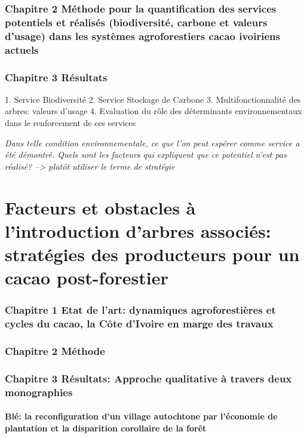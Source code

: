 \documentclass[a4paper,notitlepage]{article}
\begin{document}
\section{Chapitre 2 Méthode pour la quantification des services potentiels et réalisés (biodiversité, carbone et valeurs d'usage) dans les systèmes agroforestiers cacao ivoiriens actuels}

\section{Chapitre 3 Résultats}

1. Service Biodiversité
2. Service Stockage de Carbone
3. Multifonctionnalité des arbres: valeurs d'usage
4. Evaluation du rôle des déterminants environnementaux dans le renforcement de ces services

\textit{Dans telle condition environnementale, ce que l'on peut espérer comme service a été démontré. Quels sont les facteurs qui expliquent que ce potentiel n'est pas réalisé? --> plutôt utiliser le terme de stratégie}

\part{Facteurs et obstacles à l'introduction d'arbres associés: stratégies des producteurs pour un cacao post-forestier}
\vspace{1cm}
\section{Chapitre 1 Etat de l'art: dynamiques agroforestières et cycles du cacao, la Côte d'Ivoire en marge des travaux}

\section{Chapitre 2 Méthode}

\section{Chapitre 3 Résultats: Approche qualitative à travers deux monographies}

\subsection{Blé: la reconfiguration d'un village autochtone par l'économie de plantation et la disparition corollaire de la forêt}
\end{document}
